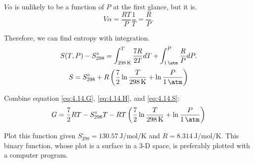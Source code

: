 \begin{@empty}
\begin{answer}
    $V\alpha$ is unlikely to be a function of $P$ at the first glance, but it
    is.
    \[ V\alpha = \frac{RT}{P} \frac{1}{T} = \frac{R}{P}.\]

    Therefore, we can find entropy with integration.
    \[ S(T, P) - S_{298}^\circ = \int_{\SI{298}{\kelvin}}^T \frac{7R}{2T} dT + \int_{\SI{1}{\atm}}^P \frac{R}{P} dP.\]
    \begin{equation}
        S = S_{298}^\circ + R \left( \frac72 \ln\frac{T}{\SI{298}{\kelvin}} + \ln\frac{P}{\SI{1}{\atm}} \right)
        \label{eq:4.14.S}
    \end{equation}

    Combine equation \eqref{eq:4.14.G}, \eqref{eq:4.14.H}, and
    \eqref{eq:4.14.S}:
    \[ G = \frac72 RT - S_{298}^\circ T - RT \left( \frac72 \ln\frac{T}{\SI{298}{\kelvin}} + \ln\frac{P}{\SI{1}{\atm}} \right) \]

    Plot this function given $S_{298}^\circ = \SI{130.57}{\joule\per\mol\per\kelvin}$
    and $R = \SI{8.314}{\joule\per\mol\per\kelvin}$.  This binary function,
    whose plot is a surface in a 3-D space, is preferably plotted with a
    computer program.
\end{answer}
\end{@empty}
